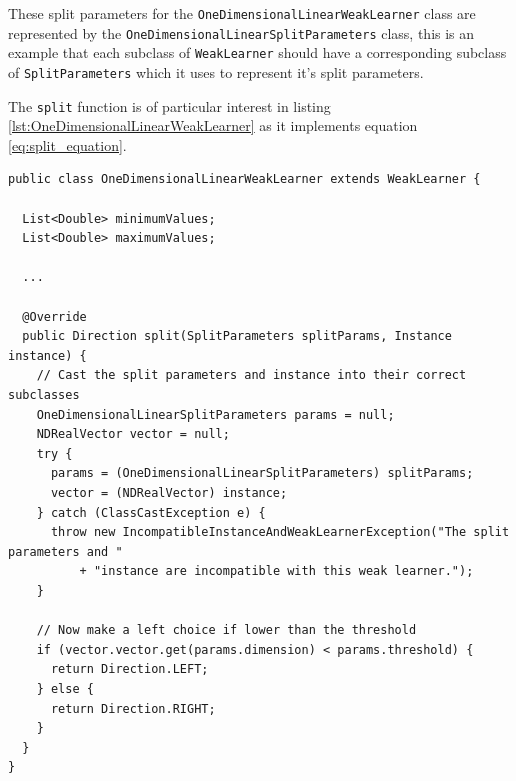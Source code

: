 \documentclass[12pt,twoside,notitlepage]{report}
\begin{document}
                These split parameters for the \texttt{OneDimensionalLinearWeakLearner} class are represented by the 
                \texttt{OneDimensionalLinearSplitParameters} class, this is an example that each subclass of 
                \texttt{WeakLearner} should have a corresponding subclass of \texttt{SplitParameters} which it uses to 
                represent it's split parameters. 

                The \texttt{split} function is of particular interest in listing \ref{lst:OneDimensionalLinearWeakLearner} as 
                it implements equation \ref{eq:split_equation}. 

                \begin{lstlisting}[caption={The \texttt{OneDimensionalLinearWeakLearner} declaration, a concrete implementation 
                of the \texttt{WeakLearner} class.}, label={lst:OneDimensionalLinearWeakLearner}]
public class OneDimensionalLinearWeakLearner extends WeakLearner {

  List<Double> minimumValues;
  List<Double> maximumValues;

  ...
  
  @Override
  public Direction split(SplitParameters splitParams, Instance instance) {
    // Cast the split parameters and instance into their correct subclasses
    OneDimensionalLinearSplitParameters params = null;
    NDRealVector vector = null;
    try {
      params = (OneDimensionalLinearSplitParameters) splitParams;
      vector = (NDRealVector) instance;
    } catch (ClassCastException e) {
      throw new IncompatibleInstanceAndWeakLearnerException("The split parameters and "
          + "instance are incompatible with this weak learner.");
    }
    
    // Now make a left choice if lower than the threshold
    if (vector.vector.get(params.dimension) < params.threshold) {
      return Direction.LEFT;
    } else {
      return Direction.RIGHT;
    }
  }
}
                \end{lstlisting}
\end{document}
